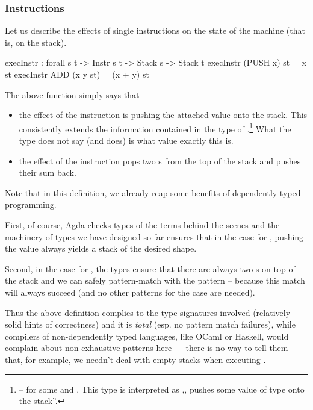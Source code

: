 \subsubsection{Instructions}

Let us describe the effects of single instructions on the state of the machine
(that is, on the stack).

\begin{code}
  execInstr : forall {s t} -> Instr s t -> Stack s -> Stack t
  execInstr (PUSH x) st = x \scons st
  execInstr ADD (x \scons y \scons st) = (x + y) \scons st
\end{code}

\noindent The above function simply says that
\begin{itemize}
  \item the effect of the instruction  is pushing the attached
    value onto the stack. This consistently extends the information contained
    in the type of .\footnote{ -- for
    some  and . This type is interpreted as ,,
    pushes some value of type  onto the stack''.}
    What the type does not say (and 
    does) is what value exactly this is.
  \item the effect of the instruction  pops two s from
    the top of the stack and pushes their sum back.
\end{itemize}

Note that in this definition, we already reap some benefits of dependently
typed programming.

First, of course, Agda checks types of the terms behind
the scenes and the machinery of types we have designed so far ensures that
in the case for , pushing the value  always yields
a stack of the desired shape.

Second, in the case for , the types ensure that there are always two
s on top of the stack and we can safely pattern-match with the
pattern  \scons {} \scons {} -- because this match
will always succeed (and no other patterns for the  case are needed). 

Thus the above definition complies to the type signatures involved (relatively
solid hints of correctness) and it is \emph{total} (esp. no pattern match failures),
while compilers of non-dependently typed languages, like OCaml or Haskell,
would complain about non-exhaustive patterns here --- there is no way to tell them
that, for example, we needn't deal with empty stacks when executing .

